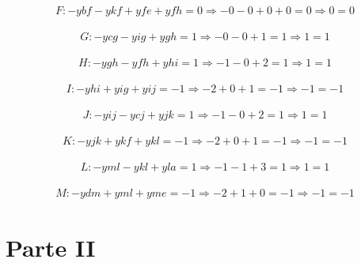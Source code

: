\documentclass[a4paper]{report}
\begin{document}
\begin{multline}
F: - ybf - ykf + yfe + yfh = 0
\Rightarrow - 0 - 0 + 0 + 0 = 0
\Rightarrow 0 = 0
\end{multline}

\begin{multline}
G: - ycg - yig + ygh = 1
\Rightarrow - 0 - 0 + 1 = 1
\Rightarrow 1 = 1
\end{multline}

\begin{multline}
H: - ygh - yfh + yhi = 1
\Rightarrow - 1 - 0 + 2 = 1
\Rightarrow 1 = 1
\end{multline}

\begin{multline}
I: - yhi + yig + yij = -1
\Rightarrow - 2 + 0 + 1 = -1
\Rightarrow -1 = -1
\end{multline}

\begin{multline}
J: - yij - ycj + yjk = 1
\Rightarrow - 1 - 0 + 2 = 1
\Rightarrow 1 = 1
\end{multline}

\begin{multline}
K: - yjk + ykf + ykl = -1
\Rightarrow - 2 + 0 + 1 = -1
\Rightarrow -1 = -1
\end{multline}

\begin{multline}
L: - yml - ykl + yla = 1
\Rightarrow - 1 - 1 + 3 = 1
\Rightarrow 1 = 1
\end{multline}

\begin{multline}
M: - ydm + yml + yme = -1
\Rightarrow - 2 + 1 + 0 = -1
\Rightarrow -1 = -1
\end{multline}


\chapter{Parte II}
\end{document}
